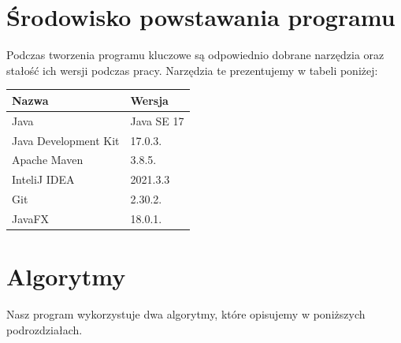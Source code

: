 \documentclass[10pt, a4paper]{report}
\begin{document}
    \section{Środowisko powstawania programu}
    Podczas tworzenia programu kluczowe są odpowiednio dobrane narzędzia oraz stałość ich wersji podczas pracy. Narzędzia te prezentujemy w tabeli poniżej:
    \newline \begin{tabularx}{\textwidth}{l|l}
      \hline Nazwa & Wersja \\
      \hline Java & Java SE 17\\
      \hline Java Development Kit & 17.0.3.\\
      \hline Apache Maven & 3.8.5. \\
      \hline InteliJ IDEA & 2021.3.3 \\
      \hline Git & 2.30.2. \\      
      \hline JavaFX & 18.0.1. \\
      \hline
    \end{tabularx}
    \newpage

    \section {Algorytmy}
    Nasz program wykorzystuje dwa algorytmy, które opisujemy w poniższych podrozdziałach.
\end{document}
